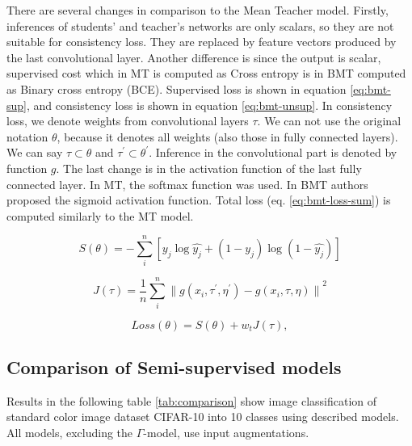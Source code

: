There are several changes in comparison to the Mean Teacher model. 
Firstly, inferences of students' and teacher's networks are only scalars, so they are not suitable for consistency loss. They are replaced by feature vectors produced by the last convolutional layer. Another difference is since the output is scalar, supervised cost which in MT is computed as Cross entropy is in BMT computed as Binary cross entropy (BCE). Supervised loss is shown in equation \ref{eq:bmt-sup}, and consistency loss is shown in equation \ref{eq:bmt-unsup}. In consistency loss, we denote weights from convolutional layers $\tau$. We can not use the original notation $\theta$, because it denotes all weights (also those in fully connected layers). We can say $\tau \subset \theta$ and $\tau^{\prime} \subset \theta^{\prime}$. Inference in the convolutional part is denoted by function $g$. The last change is in the activation function of the last fully connected layer. In MT, the softmax function was used. In BMT authors proposed the sigmoid activation function. Total loss (eq. \ref{eq:bmt-loss-sum}) is computed similarly to the MT model.


\begin{equation}
	S(\theta) = - \sum_{i}^{n}[y_j \log{\hat{y_j}} + (1-y_j)\log{(1-\hat{y_j})}]
	\label{eq:bmt-sup}
\end{equation} 

\begin{equation}
    J(\tau) = \frac{1}{n} \sum_i^n {\| g(x_i,\tau^{\prime},\eta^{\prime}) - g(x_i,\tau,\eta) \|}^2
	\label{eq:bmt-unsup}
\end{equation} 

\begin{equation}
	Loss(\theta) = S(\theta) + w_t J(\tau),
	\label{eq:bmt-loss-sum}
\end{equation} 

\subsection{Comparison of Semi-supervised models}

Results in the following table \ref{tab:comparison} show image classification of standard color image dataset CIFAR-10 into 10 classes using described models. All models, excluding the $\Gamma$-model, use input augmentations.

